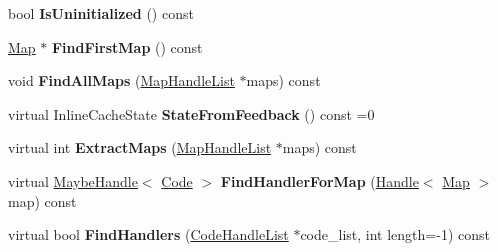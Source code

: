\begin{DoxyCompactItemize}
\item 
bool {\bfseries Is\+Uninitialized} () const \hypertarget{classv8_1_1internal_1_1_feedback_nexus_ade3a9765aedfafd1eb5f831d58c16f30}{}\label{classv8_1_1internal_1_1_feedback_nexus_ade3a9765aedfafd1eb5f831d58c16f30}

\item 
\hyperlink{classv8_1_1internal_1_1_map}{Map} $\ast$ {\bfseries Find\+First\+Map} () const \hypertarget{classv8_1_1internal_1_1_feedback_nexus_a876ee677df57a7a204f4dfc8f3af7211}{}\label{classv8_1_1internal_1_1_feedback_nexus_a876ee677df57a7a204f4dfc8f3af7211}

\item 
void {\bfseries Find\+All\+Maps} (\hyperlink{classv8_1_1internal_1_1_list}{Map\+Handle\+List} $\ast$maps) const \hypertarget{classv8_1_1internal_1_1_feedback_nexus_ad1444279ddb24633c3dd6b68bfe67d9f}{}\label{classv8_1_1internal_1_1_feedback_nexus_ad1444279ddb24633c3dd6b68bfe67d9f}

\item 
virtual Inline\+Cache\+State {\bfseries State\+From\+Feedback} () const  =0\hypertarget{classv8_1_1internal_1_1_feedback_nexus_adf402d725ab93cd0d6aed5ca9eba2dbe}{}\label{classv8_1_1internal_1_1_feedback_nexus_adf402d725ab93cd0d6aed5ca9eba2dbe}

\item 
virtual int {\bfseries Extract\+Maps} (\hyperlink{classv8_1_1internal_1_1_list}{Map\+Handle\+List} $\ast$maps) const \hypertarget{classv8_1_1internal_1_1_feedback_nexus_a3dae5080fc4113bef5784c92e62cd928}{}\label{classv8_1_1internal_1_1_feedback_nexus_a3dae5080fc4113bef5784c92e62cd928}

\item 
virtual \hyperlink{classv8_1_1internal_1_1_maybe_handle}{Maybe\+Handle}$<$ \hyperlink{classv8_1_1internal_1_1_code}{Code} $>$ {\bfseries Find\+Handler\+For\+Map} (\hyperlink{classv8_1_1internal_1_1_handle}{Handle}$<$ \hyperlink{classv8_1_1internal_1_1_map}{Map} $>$ map) const \hypertarget{classv8_1_1internal_1_1_feedback_nexus_af1ddb4e6a73477d0c437116e5a040776}{}\label{classv8_1_1internal_1_1_feedback_nexus_af1ddb4e6a73477d0c437116e5a040776}

\item 
virtual bool {\bfseries Find\+Handlers} (\hyperlink{classv8_1_1internal_1_1_list}{Code\+Handle\+List} $\ast$code\+\_\+list, int length=-\/1) const \hypertarget{classv8_1_1internal_1_1_feedback_nexus_aa93c053f1e1e47c3c28654fa97017ec4}{}\label{classv8_1_1internal_1_1_feedback_nexus_aa93c053f1e1e47c3c28654fa97017ec4}


\end{DoxyCompactItemize}

